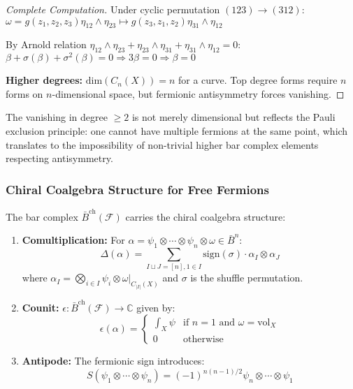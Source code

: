 \begin{proof}[Complete Computation]
Under cyclic permutation $(123) \to (312)$:
$\omega = g(z_1,z_2,z_3)\eta_{12} \wedge \eta_{23} \mapsto g(z_3,z_1,z_2)\eta_{31} \wedge \eta_{12}$

By Arnold relation $\eta_{12} \wedge \eta_{23} + \eta_{23} \wedge \eta_{31} + \eta_{31} \wedge \eta_{12} = 0$:
$\beta + \sigma(\beta) + \sigma^2(\beta) = 0 \Rightarrow 3\beta = 0 \Rightarrow \beta = 0$

\textbf{Higher degrees:} $\text{dim}(C_n(X)) = n$ for a curve. Top degree forms require $n$ forms on $n$-dimensional space, but fermionic antisymmetry forces vanishing.
\end{proof}

\begin{remark}
The vanishing in degree $\geq 2$ is not merely dimensional but reflects the Pauli exclusion principle: one cannot have multiple fermions at the same point, which translates to the impossibility of non-trivial higher bar complex elements respecting antisymmetry.
\end{remark}

 
\subsubsection{Chiral Coalgebra Structure for Free Fermions}

\begin{theorem}\label{thm:fermion-bar-coalg}
The bar complex $\bar{B}^{\text{ch}}(\mathcal{F})$ carries the chiral coalgebra structure:
\begin{enumerate}
\item \textbf{Comultiplication:} For $\alpha = \psi_1 \otimes \cdots \otimes \psi_n \otimes \omega \in \bar{B}^n$:
\[
\Delta(\alpha) = \sum_{I \sqcup J = [n], 1 \in I} \text{sign}(\sigma) \cdot \alpha_I \otimes \alpha_J
\]
where $\alpha_I = \bigotimes_{i \in I} \psi_i \otimes \omega|_{C_{|I|}(X)}$ and $\sigma$ is the shuffle permutation.

\item \textbf{Counit:} $\epsilon: \bar{B}^{\text{ch}}(\mathcal{F}) \to \mathbb{C}$ given by:
\[
\epsilon(\alpha) = \begin{cases}
\int_X \psi & \text{if } n = 1 \text{ and } \omega = \text{vol}_X \\
0 & \text{otherwise}
\end{cases}
\]

\item \textbf{Antipode:} The fermionic sign introduces:
\[
S(\psi_1 \otimes \cdots \otimes \psi_n) = (-1)^{n(n-1)/2} \psi_n \otimes \cdots \otimes \psi_1
\]
\end{enumerate}
\end{theorem}

